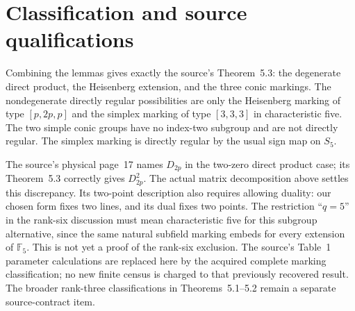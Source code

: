 \documentclass[11pt]{article}
\newcommand{\F}{\mathbb F}\newcommand{\PSL}{\operatorname{PSL}}
\begin{document}
\section*{Classification and source qualifications}
Combining the lemmas gives exactly the source's Theorem~5.3: the
degenerate direct product, the Heisenberg extension, and the three conic
markings. The nondegenerate directly regular possibilities are only the
Heisenberg marking of type $[p,2p,p]$ and the simplex marking of type
$[3,3,3]$ in characteristic five. The two simple conic groups have no
index-two subgroup and are not directly regular. The simplex marking
is directly regular by the usual sign map on $S_5$.

The source's physical page~17 names $D_{2p}$ in the two-zero direct
product case; its Theorem~5.3 correctly gives $D_{2p}^2$. The actual
matrix decomposition above settles this discrepancy. Its two-point
description also requires allowing duality: our chosen form fixes two
lines, and its dual fixes two points. The restriction
``$q=5$'' in the rank-six discussion must mean characteristic five
for this subgroup alternative, since the same natural subfield marking
embeds for every extension of $\F_5$. This is not yet a proof of the
rank-six exclusion. The source's Table~1 parameter calculations are
replaced here by the acquired complete marking classification; no new
finite census is charged to that previously recovered result. The broader
rank-three classifications in Theorems~5.1--5.2 remain a separate
source-contract item.
\end{document}
